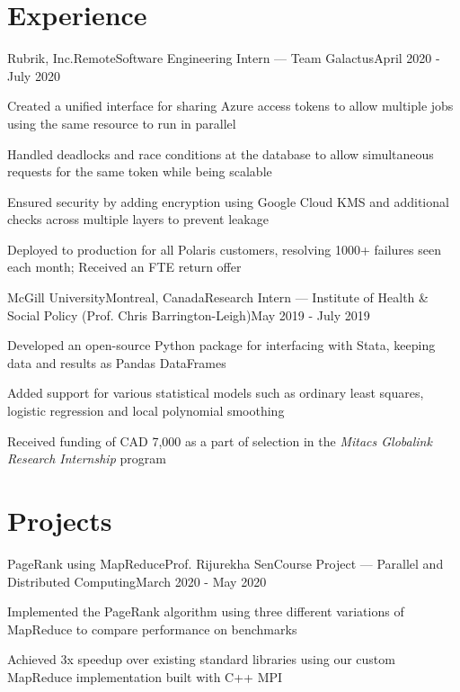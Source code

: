 \documentclass[letterpaper,10pt]{resume}
\begin{document}
\section{Experience}
\begin{rSubsection}{Rubrik, Inc.}{Remote}{Software Engineering Intern --- Team Galactus}{April 2020 - July 2020}
\item Created a unified interface for sharing Azure access tokens to allow multiple jobs using the same resource to run in parallel
\item Handled deadlocks and race conditions at the database to allow simultaneous requests for the same token while being scalable
\item Ensured security by adding encryption using Google Cloud KMS and additional checks across multiple layers to prevent leakage
\item Deployed to production for all Polaris customers, resolving 1000+ failures seen each month; Received an FTE return offer
\end{rSubsection}
\begin{rSubsection}{McGill University}{Montreal, Canada}{Research Intern --- Institute of Health \& Social Policy (Prof. Chris Barrington-Leigh)}{May 2019 - July 2019}
\item Developed an open-source Python package for interfacing with Stata, keeping data and results as Pandas DataFrames 
\item Added support for various statistical models such as ordinary least squares, logistic regression and local polynomial smoothing
\item Received funding of CAD 7,000 as a part of selection in the \textit{Mitacs Globalink Research Internship} program
\end{rSubsection}

\vspace{-0.1cm}
\section{Projects}


\begin{rSubsection}{PageRank using MapReduce}{Prof. Rijurekha Sen}{Course Project --- Parallel and Distributed Computing}{March 2020 - May 2020}
\item Implemented the PageRank algorithm using three different variations of MapReduce to compare performance on benchmarks
\item Achieved 3x speedup over existing standard libraries using our custom MapReduce implementation built with C++ MPI
\end{rSubsection}
\end{document}

